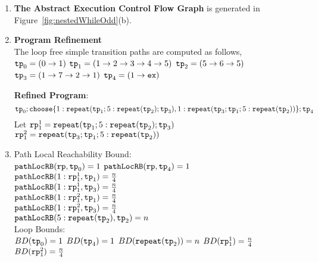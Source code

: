   \begin{enumerate}
    \item  \textbf{The Abstract Execution Control Flow Graph} is generated in Figure~\ref{fig:nestedWhileOdd}(b).
    \item \textbf{Program Refinement}
    \\
    The loop free simple transition paths are computed as follows,
      \\ 
    $\mathtt{tp}_0 = (0 \to 1)$
      \quad
      $\mathtt{tp}_1 = (1 \to 2 \to 3 \to 4 \to 5)$
      \quad
      $\mathtt{tp}_2 = (5 \to 6 \to 5)$
      \quad
      $\mathtt{tp}_3 = (1 \to 7 \to 2 \to 1)$
      \quad
      $\mathtt{tp}_4 = (1 \to \mathtt{ex})$

  \textbf{Refined Program}:
  \[
    \tpath_0 ; \rpchoose{1: \rprepeat(\tpath_1; 5:\rprepeat(\tpath_2); \tpath_3) , 
    1: \rprepeat(\tpath_3; \tpath_1; 5:\rprepeat(\tpath_2))}; \tpath_4
    \]
    Let $\mathtt{rp}_1^1 = \mathtt{repeat}(\mathtt{tp}_1; 5:\mathtt{repeat}(\mathtt{tp}_2); \mathtt{tp}_3)$
    \\
    $\mathtt{rp}_1^2 = \mathtt{repeat}(\mathtt{tp}_3; \mathtt{tp}_1; 5:\mathtt{repeat}(\mathtt{tp}_2))$
    \item {Path Local Reachability Bound}:
    \\
    $\mathtt{pathLocRB}(\mathtt{rp}, \mathtt{tp}_0) = 1$ \quad
    $\mathtt{pathLocRB}(\mathtt{rp}, \mathtt{tp}_4) = 1$ \\
    $\mathtt{pathLocRB}(1: \mathtt{rp}_1^1, \mathtt{tp}_1) = \frac{n}{4}$ \\
    $\mathtt{pathLocRB}(1: \mathtt{rp}_1^1, \mathtt{tp}_3) = \frac{n}{4}$ \\
    $\mathtt{pathLocRB}(1: \mathtt{rp}_1^2, \mathtt{tp}_1) = \frac{n}{4}$ \\
    $\mathtt{pathLocRB}(1: \mathtt{rp}_1^2, \mathtt{tp}_3) = \frac{n}{4}$ \\
    $\mathtt{pathLocRB}(5: \mathtt{repeat}(\mathtt{tp}_2), \mathtt{tp}_2) = n$ 
    \\
    Loop Bounds:
    \\
    $BD(\mathtt{tp}_0) = 1$
    \quad
    $BD(\mathtt{tp}_4) = 1$
    \quad
    $BD(\mathtt{repeat}(\mathtt{tp}_2)) = n $
    \quad
    $BD(\mathtt{rp}_1^1) = \frac{n}{4} $
    \quad
    $BD(\mathtt{rp}_1^2) = \frac{n}{4} $


\end{enumerate}
